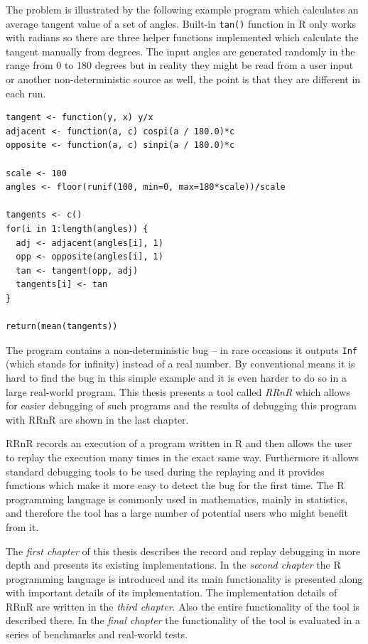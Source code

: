 \documentclass[thesis=M,english,hidelinks]{FITthesis}[2012/10/20]
\begin{document}
The problem is illustrated by the following example program which calculates an average tangent value of a set of angles. Built-in \lstinline|tan()| function in R only works with radians so there are three helper functions implemented which calculate the tangent manually from degrees. The input angles are generated randomly in the range from 0 to 180 degrees but in reality they might be read from a user input or another non-deterministic source as well, the point is that they are different in each run.\par

\begin{lstlisting}[style=filestyle, caption={The program containing a non-deterministic bug}]
tangent <- function(y, x) y/x
adjacent <- function(a, c) cospi(a / 180.0)*c
opposite <- function(a, c) sinpi(a / 180.0)*c

scale <- 100
angles <- floor(runif(100, min=0, max=180*scale))/scale

tangents <- c()
for(i in 1:length(angles)) {
  adj <- adjacent(angles[i], 1)
  opp <- opposite(angles[i], 1)
  tan <- tangent(opp, adj)
  tangents[i] <- tan
}

return(mean(tangents))
\end{lstlisting}

The program contains a non-deterministic bug -- in rare occasions it outputs \lstinline|Inf| (which stands for infinity) instead of a real number. By conventional means it is hard to find the bug in this simple example and it is even harder to do so in a large real-world program. This thesis presents a tool called \emph{RRnR} which allows for easier debugging of such programs and the results of debugging this program with RRnR are shown in the last chapter.\par

RRnR records an execution of a program written in R and then allows the user to replay the execution many times in the exact same way. Furthermore it allows standard debugging tools to be used during the replaying and it provides functions which make it more easy to detect the bug for the first time. The R programming language is commonly used in mathematics, mainly in statistics, and therefore the tool has a large number of potential users who might benefit from it.\par

The \emph{first chapter} of this thesis describes the record and replay debugging in more depth and presents its existing implementations. In the \emph{second chapter} the R programming language is introduced and its main functionality is presented along with important details of its implementation. The implementation details of RRnR are written in the \emph{third chapter}. Also the entire functionality of the tool is described there. In the \emph{final chapter} the functionality of the tool is evaluated in a series of benchmarks and real-world tests.\par
\end{document}
